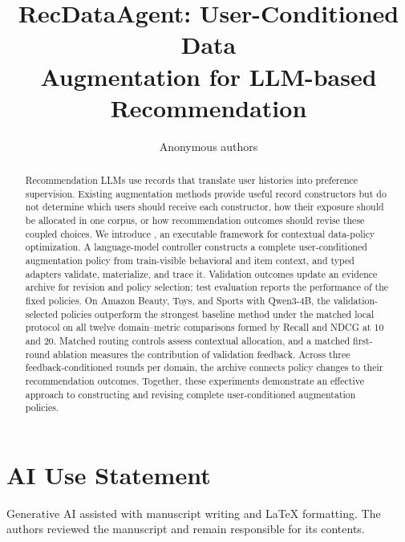 \documentclass{article}
\title{RecDataAgent: User-Conditioned Data\\Augmentation for LLM-based Recommendation}
\author{Anonymous authors}
\begin{document}
\maketitle
\begin{abstract}
Recommendation LLMs use records that translate user histories into preference supervision. Existing augmentation methods provide useful record constructors but do not determine which users should receive each constructor, how their exposure should be allocated in one corpus, or how recommendation outcomes should revise these coupled choices. We introduce \method{}, an executable framework for contextual data-policy optimization. A language-model controller constructs a complete user-conditioned augmentation policy from train-visible behavioral and item context, and typed adapters validate, materialize, and trace it. Validation outcomes update an evidence archive for revision and policy selection; test evaluation reports the performance of the fixed policies. On Amazon Beauty, Toys, and Sports with Qwen3-4B, the validation-selected policies outperform the strongest baseline method under the matched local protocol on all twelve domain--metric comparisons formed by Recall and NDCG at 10 and 20. Matched routing controls assess contextual allocation, and a matched first-round ablation measures the contribution of validation feedback. Across three feedback-conditioned rounds per domain, the archive connects policy changes to their recommendation outcomes. Together, these experiments demonstrate an effective approach to constructing and revising complete user-conditioned augmentation policies.
\end{abstract}





\FloatBarrier
\section*{AI Use Statement}
Generative AI assisted with manuscript writing and LaTeX formatting. The authors reviewed the manuscript and remain responsible for its contents.


\appendix

\end{document}
